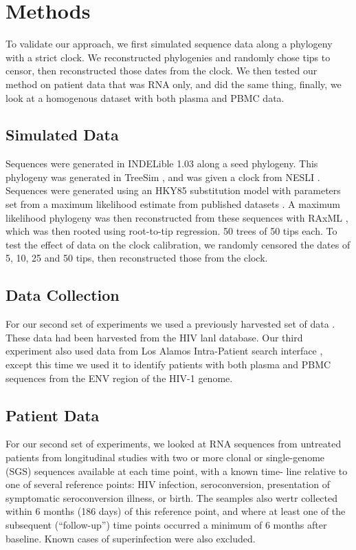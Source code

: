 \section{Methods} \label{sec:methods}
To validate our approach, we first simulated sequence data along a phylogeny with a strict clock. We reconstructed phylogenies and randomly chose tips to censor, then reconstructed those dates from the clock. We then tested our method on patient data that was RNA only, and did the same thing, finally, we look at a homogenous dataset with both plasma and PBMC data. 

\subsection{Simulated Data} \label{subsec:simdata}
Sequences were generated in INDELible 1.03 \citep{Indelible09} along a seed phylogeny. This phylogeny was generated in TreeSim \citep{TreeSim}, and was given a clock from NESLI \citep{NELSI}. Sequences were generated using an HKY85 substitution model with parameters set from a maximum likelihood estimate from published datasets \citep{McCloskey14}. A maximum likelihood phylogeny was then reconstructed from these sequences with RAxML \citep{Raxml14}, which was then rooted using root-to-tip regression. 50 trees of 50 tips each. To test the effect of data on the clock calibration, we randomly censored the dates of 5, 10, 25 and 50 tips, then reconstructed those from the clock.


\subsection{Data Collection} \label{subsec:dcollection}
For our second set of experiments we used a previously harvested set of data \citep{McCloskey14}. These data had been harvested from the HIV lanl database. Our third experiment also used data from Los Alamos Intra-Patient search interface \citep{LosAlamos}, except this time we used it to identify patients with both plasma and PBMC sequences from the ENV region of the HIV-1 genome. 

\subsection{Patient Data} \label{subsec:patdata}
 For our second set of experiments, we looked at RNA sequences from untreated patients from longitudinal studies with two or more clonal or single-genome (SGS) sequences available at each time point, with a known time- line relative to one of several reference points: HIV infection, seroconversion, presentation of symptomatic seroconversion illness, or birth. The seamples also wertr collected within 6 months (186 days) of this reference point, and where at least one of the subsequent (“follow-up”) time points occurred a minimum of 6 months after baseline. Known cases of superinfection were also excluded. 
 
